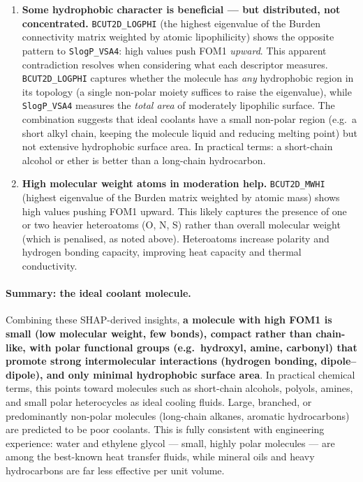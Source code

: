 \documentclass[11pt,a4paper]{article}
\begin{document}
\begin{enumerate}
    \item \textbf{Some hydrophobic character is beneficial --- but distributed, not concentrated.} \texttt{BCUT2D\_LOGPHI} (the highest eigenvalue of the Burden connectivity matrix weighted by atomic lipophilicity) shows the opposite pattern to \texttt{SlogP\_VSA4}: high values push FOM1 \emph{upward}. This apparent contradiction resolves when considering what each descriptor measures. \texttt{BCUT2D\_LOGPHI} captures whether the molecule has \emph{any} hydrophobic region in its topology (a single non-polar moiety suffices to raise the eigenvalue), while \texttt{SlogP\_VSA4} measures the \emph{total area} of moderately lipophilic surface. The combination suggests that ideal coolants have a small non-polar region (e.g.\ a short alkyl chain, keeping the molecule liquid and reducing melting point) but not extensive hydrophobic surface area. In practical terms: a short-chain alcohol or ether is better than a long-chain hydrocarbon.

    \item \textbf{High molecular weight atoms in moderation help.} \texttt{BCUT2D\_MWHI} (highest eigenvalue of the Burden matrix weighted by atomic mass) shows high values pushing FOM1 upward. This likely captures the presence of one or two heavier heteroatoms (O, N, S) rather than overall molecular weight (which is penalised, as noted above). Heteroatoms increase polarity and hydrogen bonding capacity, improving heat capacity and thermal conductivity.
\end{enumerate}

\paragraph{Summary: the ideal coolant molecule.}
Combining these SHAP-derived insights, \textbf{a molecule with high FOM1 is small (low molecular weight, few bonds), compact rather than chain-like, with polar functional groups (e.g.\ hydroxyl, amine, carbonyl) that promote strong intermolecular interactions (hydrogen bonding, dipole--dipole), and only minimal hydrophobic surface area}. In practical chemical terms, this points toward molecules such as short-chain alcohols, polyols, amines, and small polar heterocycles as ideal cooling fluids. Large, branched, or predominantly non-polar molecules (long-chain alkanes, aromatic hydrocarbons) are predicted to be poor coolants. This is fully consistent with engineering experience: water and ethylene glycol --- small, highly polar molecules --- are among the best-known heat transfer fluids, while mineral oils and heavy hydrocarbons are far less effective per unit volume.
\end{document}

